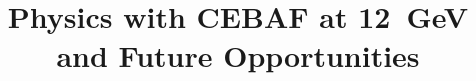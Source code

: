 \documentclass[final,3p,times,reversenotenum]{elsarticle}
\begin{document}
\begin{frontmatter}

\title{
       Physics with CEBAF at 12~GeV and Future Opportunities %
       }

 

 



\begin{keyword}



\end{keyword}

\end{frontmatter}
\let\WriteBookmarks\relax

\tableofcontents

 

 



 








\appendix










 

\end{document}
